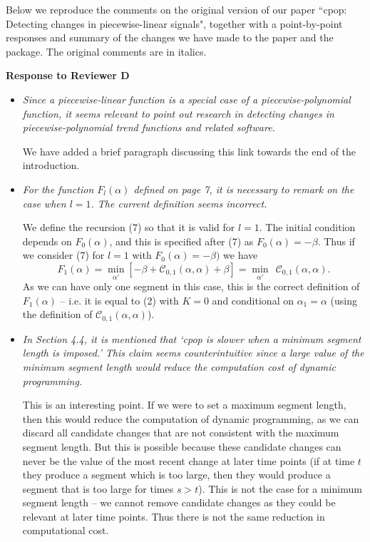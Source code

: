 \documentclass[12pt]{article}
\begin{document}
\maketitle

Below we reproduce the comments on the original version of our paper ``cpop: Detecting changes in piecewise-linear signals", together with a point-by-point responses and summary of the changes we have made to the paper and the package. The original comments are in italics.

\vspace*{1ex}

\noindent
{\bf Response to Reviewer D}

\begin{itemize}
\item {\em   Since a piecewise-linear function is a special case of a piecewise-polynomial function, it seems relevant to point out research in detecting changes in piecewise-polynomial trend functions and related software.}

We have added a brief paragraph discussing this link towards the end of the introduction. 

\item {\em   For the function $F_l(\alpha)$ defined on page 7, it is necessary to remark on the case when $l = 1$. The current definition seems incorrect.}

We define the recursion (7) so that it is valid for $l=1$. The initial condition depends on $F_0(\alpha)$, and this is specified after (7) as $F_0(\alpha)=-\beta$. Thus if we consider (7) for $l=1$ with $F_0(\alpha)=-\beta)$ we have
\[
F_1(\alpha)=\min_{\alpha'} \left[-\beta +  \mathcal{C}_{0,1}(\alpha,\alpha)  +\beta \right]=  \min_{\alpha'}   ~~ \mathcal{C}_{0,1}(\alpha,\alpha). 
\]
As we can have only one segment in this case, this is the correct definition of $F_1(\alpha)$ -- i.e. it is equal to (2) with $K=0$ and conditional on $\alpha_1=\alpha$ (using the definition of $\mathcal{C}_{0,1}(\alpha,\alpha)$).

\item {\em   In Section 4.4, it is mentioned that ‘cpop is slower when a minimum segment length is imposed.’ This claim seems counterintuitive since a large value of the minimum segment length would reduce the computation cost of dynamic programming.}

This is an interesting point. If we were to set a maximum segment length, then this would reduce the computation of dynamic programming, as we can discard all candidate changes that are not consistent with the maximum segment length. But this is possible because these candidate changes can never be the value of the most recent change at later time points (if at time $t$ they produce a segment which is too large, then they would produce a segment that is too large for times $s>t$). This is not the case for a minimum segment length -- we cannot remove candidate changes as they could be relevant at later time points. Thus there is not the same reduction in computational cost.


\end{itemize}
\end{document}

